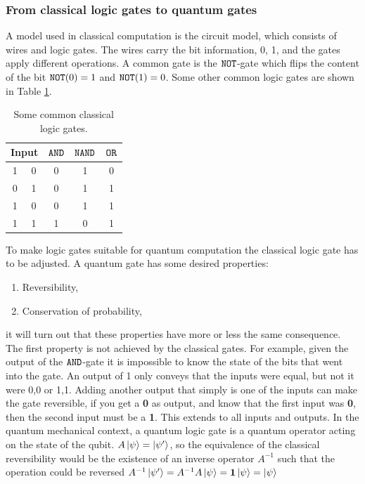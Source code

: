 \subsubsection{From classical logic gates to quantum gates}
A model used in classical computation is the circuit model, which consists of wires and logic gates. The wires carry the bit information, 0, 1, and the gates apply different operations. A common gate is the ${\tt NOT}$-gate which flips the content of the bit ${\tt NOT}(0) = 1$ and ${\tt NOT}(1) = 0$. Some other common logic gates are shown in Table \ref{tab:gates}. 

\begin{table}[h]
    \centering
    \begin{tabular}{|c|c|c|c|c|}
    \hline
    \multicolumn{2}{|c|}{Input} & ${\tt AND}$ & ${\tt NAND}$ & ${\tt OR}$\\
    \hline
    1 & 0 & 0& 1& 0\\
    0 & 1 & 0& 1& 1\\
    1 & 0 & 0& 1& 1\\
    1 & 1 & 1& 0& 1\\
    \hline
    \end{tabular}
    \caption{Some common classical logic gates.}
    \label{tab:gates}
\end{table}


To make logic gates suitable for quantum computation the classical logic gate has to be adjusted. A quantum gate has some desired properties:
\begin{enumerate}
\item Reversibility,
\item Conservation of probability,
\end{enumerate}
it will turn out that these properties have more or less the same consequence. The first property is not achieved by the classical gates. For example, given the output of the ${\tt AND}$-gate it is impossible to know the state of the bits that went into the gate. An output of 1 only conveys that the inputs were equal, but not it were 0,0 or 1,1. Adding another output that simply is one of the inputs can make the gate reversible, if you get a \textbf{0} as output, and know that the first input was \textbf{0}, then the second input must be a \textbf{1}. This extends to all inputs and outputs. In the quantum mechanical context, a quantum logic gate is a quantum operator acting on the state of the qubit. $A\ket{\psi} = \ket{\psi'}$, so the equivalence of the classical reversibility would be the existence of an inverse operator $A^{-1}$ such that the operation could be reversed $A^{-1}\ket{\psi'} = A^{-1}A\ket{\psi} = \mathbf{1}\ket{\psi} = \ket{\psi}$

